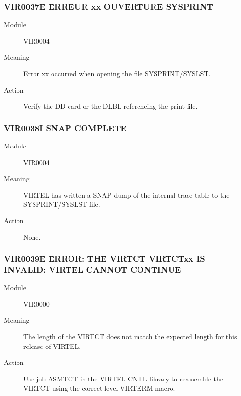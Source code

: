 \documentclass[letterpaper,10pt,english]{sphinxmanual}
\begin{document}
\subsubsection{VIR0037E ERREUR xx OUVERTURE SYSPRINT}
\label{\detokenize{messages:vir0037e-erreur-xx-ouverture-sysprint}}\begin{description}
\item[{Module}] \leavevmode
VIR0004

\item[{Meaning}] \leavevmode
Error xx occurred when opening the file SYSPRINT/SYSLST.

\item[{Action}] \leavevmode
Verify the DD card or the DLBL referencing the print file.

\end{description}


\subsubsection{VIR0038I SNAP COMPLETE}
\label{\detokenize{messages:vir0038i-snap-complete}}\begin{description}
\item[{Module}] \leavevmode
VIR0004

\item[{Meaning}] \leavevmode
VIRTEL has written a SNAP dump of the internal trace table to the SYSPRINT/SYSLST file.

\item[{Action}] \leavevmode
None.

\end{description}


\subsubsection{VIR0039E ERROR: THE VIRTCT VIRTCTxx IS INVALID: VIRTEL CANNOT CONTINUE}
\label{\detokenize{messages:vir0039e-error-the-virtct-virtctxx-is-invalid-virtel-cannot-continue}}\begin{description}
\item[{Module}] \leavevmode
VIR0000

\item[{Meaning}] \leavevmode
The length of the VIRTCT does not match the expected length for this release of VIRTEL.

\item[{Action}] \leavevmode
Use job ASMTCT in the VIRTEL CNTL library to reassemble the VIRTCT using the correct level VIRTERM macro.

\end{description}
\end{document}
